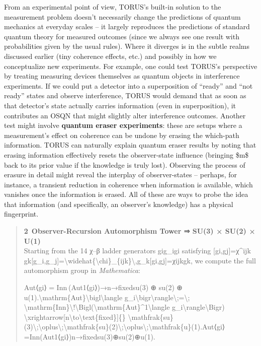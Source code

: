 From an experimental point of view, TORUS's built-in solution to the
measurement problem doesn't necessarily change the predictions of
quantum mechanics at everyday scales -- it largely reproduces the
predictions of standard quantum theory for measured outcomes (since we
always see one result with probabilities given by the usual rules).
Where it diverges is in the subtle realms discussed earlier (tiny
coherence effects, etc.) and possibly in how we conceptualize new
experiments. For example, one could test TORUS's perspective by treating
measuring devices themselves as quantum objects in interference
experiments. If we could put a detector into a superposition of
``ready'' and ``not ready'' states and observe interference, TORUS would
demand that as soon as that detector's state actually carries
information (even in superposition), it contributes an OSQN that might
slightly alter interference outcomes. Another test might involve
\textbf{quantum eraser experiments}: these are setups where a
measurement's effect on coherence can be undone by erasing the
which-path information. TORUS can naturally explain quantum eraser
results by noting that erasing information effectively resets the
observer-state influence (bringing \$m\$ back to its prior value if the
knowledge is truly lost). Observing the process of erasure in detail
might reveal the interplay of observer-states -- perhaps, for instance,
a transient reduction in coherence when information is available, which
vanishes once the information is erased. All of these are ways to probe
the idea that information (and specifically, an observer's knowledge)
has a physical fingerprint.

\begin{quote}
\textbf{2 Observer-Recursion Automorphism Tower ⇒ SU(3) × SU(2) ×
U(1)}\\
Starting from the 14 χ--β ladder generators gig\_igi​ satisfying
{[}gi,gj{]}=χ\^{}ijk gk{[}g\_i,g\_j{]}=\textbackslash{}widehat\{\textbackslash{}chi\}\_\{ijk\}\textbackslash{},g\_k{[}gi​,gj​{]}=χ​ijk​gk​,
we compute the full automorphism group in \emph{Mathematica}:

Aut⟨gi⟩  =  Inn ⁣(Aut1⟨gi⟩)→n→fixedsu(3)  ⊕  su(2)  ⊕  u(1).\textbackslash{}mathrm\{Aut\}\textbackslash{}bigl\textbackslash{}langle
g\_i\textbackslash{}bigr\textbackslash{}rangle\textbackslash{};=\textbackslash{};
\textbackslash{}mathrm\{Inn\}\textbackslash{}!\textbackslash{}Bigl(\textbackslash{}mathrm\{Aut\}\^{}1\textbackslash{}langle
g\_i\textbackslash{}rangle\textbackslash{}Bigr)
\textbackslash{}xrightarrow{[}n\textbackslash{}to\textbackslash{}text\{fixed\}{]}\{\}
\textbackslash{}mathfrak\{su\}(3)\textbackslash{};\textbackslash{}oplus\textbackslash{};\textbackslash{}mathfrak\{su\}(2)\textbackslash{};\textbackslash{}oplus\textbackslash{};\textbackslash{}mathfrak\{u\}(1).Aut⟨gi​⟩=Inn(Aut1⟨gi​⟩)n→fixed​su(3)⊕su(2)⊕u(1).
\end{quote}


